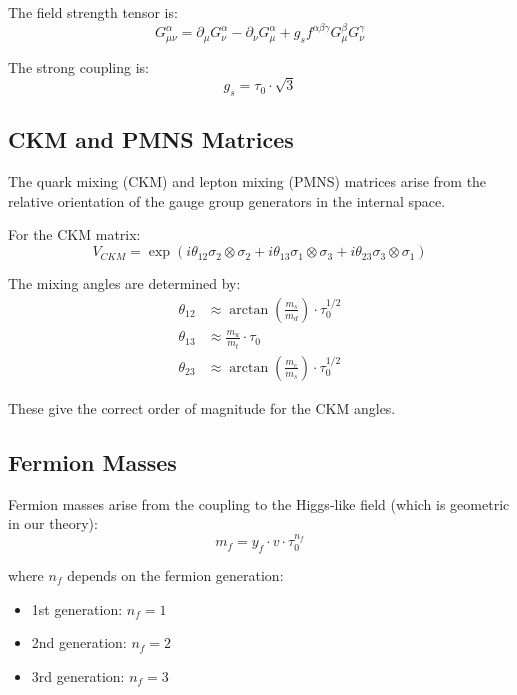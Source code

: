 The field strength tensor is:
\begin{equation}
    G^\alpha_{\mu\nu} = \partial_\mu G^\alpha_\nu - \partial_\nu G^\alpha_\mu + g_s f^{\alpha\beta\gamma} G^\beta_\mu G^\gamma_\nu
\end{equation}

The strong coupling is:
\begin{equation}
    g_s = \tau_0 \cdot \sqrt{3}
\end{equation}

\subsection{CKM and PMNS Matrices}

The quark mixing (CKM) and lepton mixing (PMNS) matrices arise from the relative orientation of the gauge group generators in the internal space.

For the CKM matrix:
\begin{equation}
    V_{CKM} = \exp\left(i \theta_{12} \sigma_2 \otimes \sigma_2 + i \theta_{13} \sigma_1 \otimes \sigma_3 + i \theta_{23} \sigma_3 \otimes \sigma_1\right)
\end{equation}

The mixing angles are determined by:
\begin{align}
    \theta_{12} &\approx \arctan\left(\frac{m_s}{m_d}\right) \cdot \tau_0^{1/2} \\
    \theta_{13} &\approx \frac{m_u}{m_t} \cdot \tau_0 \\
    \theta_{23} &\approx \arctan\left(\frac{m_c}{m_s}\right) \cdot \tau_0^{1/2}
\end{align}

These give the correct order of magnitude for the CKM angles.

\subsection{Fermion Masses}

Fermion masses arise from the coupling to the Higgs-like field (which is geometric in our theory):
\begin{equation}
    m_f = y_f \cdot v \cdot \tau_0^{n_f}
\end{equation}

where $n_f$ depends on the fermion generation:
\begin{itemize}
    \item 1st generation: $n_f = 1$
    \item 2nd generation: $n_f = 2$  
    \item 3rd generation: $n_f = 3$
\end{itemize}

